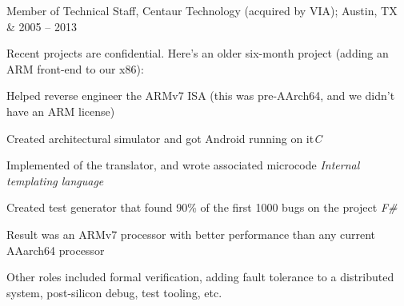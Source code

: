 \documentclass[letterpaper]{scrartcl}
\begin{document}
\begin{list1}
\item \begin{tabular1bold} Member of Technical Staff, Centaur Technology (acquired by VIA); Austin, TX & 2005 -- 2013 \end{tabular1bold}

  \begin{list2}
  \item Recent projects are confidential. Here's an older six-month project (adding an ARM front-end to our x86):
    \begin{list3}
    \item Helped reverse engineer the ARMv7 ISA (this was pre-AArch64, and we didn't have an ARM license)
    \item Created architectural simulator and got Android running on it\hfill \emph{C}
    \item Implemented  of the translator, and wrote associated microcode \hfill \emph{Internal templating language}
    \item Created test generator that found 90\% of the first 1000 bugs on the project \hfill \emph{F\#}
    \item Result was an ARMv7 processor with better performance than any current AAarch64 processor
    \end{list3}
  \item Other roles included formal verification, adding fault tolerance to a distributed system, post-silicon debug, test tooling, etc.
    
    



\end{list2}
\end{list1}
\end{document}
